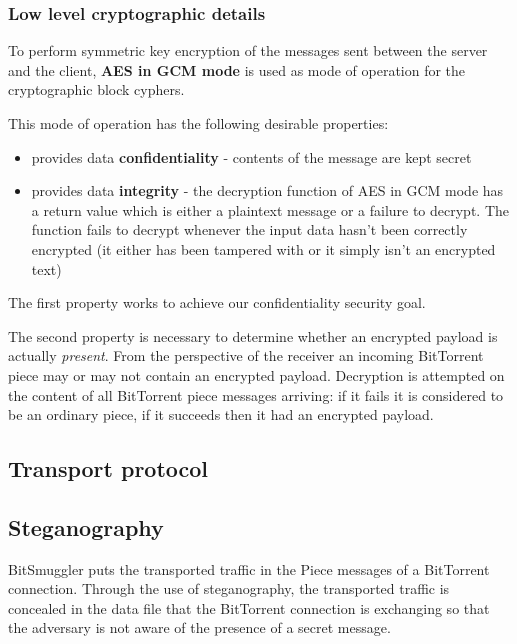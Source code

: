 \documentclass[11pt]{book} %
\newcommand{\projectName}{BitSmuggler }
\begin{document}

\subsubsection{Low level cryptographic details}

To perform symmetric key encryption of the messages sent between the server and the client, \textbf{AES in GCM mode} is used as mode of operation for the cryptographic block cyphers.

This mode of operation has the following desirable properties:
\begin{itemize}
\item provides data \textbf{confidentiality} - contents of the message are kept secret
\item provides data \textbf{integrity} - the decryption function of AES in GCM mode has a return value which is either a plaintext message or a failure to decrypt. The function fails to decrypt whenever the input data hasn't been correctly encrypted (it either has been tampered with or it simply isn't an encrypted text)
\end{itemize}

The first property works to achieve our confidentiality security goal.

The second property is necessary to determine whether an encrypted payload is actually \textit{present}.  From the perspective of the receiver an incoming BitTorrent piece may or may not contain an encrypted payload. Decryption is attempted on the content of all BitTorrent piece messages arriving: if it fails it is considered to be an ordinary piece, if it succeeds then it had an encrypted payload.

\subsection{Transport protocol}


\subsection{Steganography}
\label{subsec:steg}

\projectName puts the transported traffic in the Piece messages of a BitTorrent connection. Through the use of steganography, the transported traffic is concealed in the data file that the BitTorrent connection is exchanging so that the adversary is not aware of the presence of a secret message.
\end{document}
